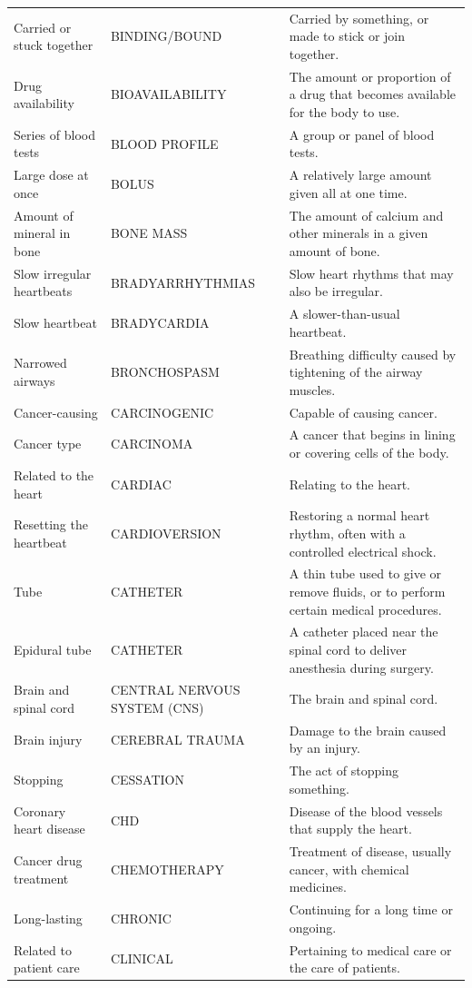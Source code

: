 \begin{longtable}{>{\raggedright\arraybackslash}p{} >{\raggedright\arraybackslash}p{} >{\raggedright\arraybackslash}p{}}
Carried or stuck together & BINDING/BOUND & Carried by something, or made to stick or join together. \\
Drug availability & BIOAVAILABILITY & The amount or proportion of a drug that becomes available for the body to use. \\
Series of blood tests & BLOOD PROFILE & A group or panel of blood tests. \\
Large dose at once & BOLUS & A relatively large amount given all at one time. \\
Amount of mineral in bone & BONE MASS & The amount of calcium and other minerals in a given amount of bone. \\
Slow irregular heartbeats & BRADYARRHYTHMIAS & Slow heart rhythms that may also be irregular. \\
Slow heartbeat & BRADYCARDIA & A slower-than-usual heartbeat. \\
Narrowed airways & BRONCHOSPASM & Breathing difficulty caused by tightening of the airway muscles. \\
Cancer-causing & CARCINOGENIC & Capable of causing cancer. \\
Cancer type & CARCINOMA & A cancer that begins in lining or covering cells of the body. \\
Related to the heart & CARDIAC & Relating to the heart. \\
Resetting the heartbeat & CARDIOVERSION & Restoring a normal heart rhythm, often with a controlled electrical shock. \\
Tube & CATHETER & A thin tube used to give or remove fluids, or to perform certain medical procedures. \\
Epidural tube & CATHETER & A catheter placed near the spinal cord to deliver anesthesia during surgery. \\
Brain and spinal cord & CENTRAL NERVOUS SYSTEM (CNS) & The brain and spinal cord. \\
Brain injury & CEREBRAL TRAUMA & Damage to the brain caused by an injury. \\
Stopping & CESSATION & The act of stopping something. \\
Coronary heart disease & CHD & Disease of the blood vessels that supply the heart. \\
Cancer drug treatment & CHEMOTHERAPY & Treatment of disease, usually cancer, with chemical medicines. \\
Long-lasting & CHRONIC & Continuing for a long time or ongoing. \\
Related to patient care & CLINICAL & Pertaining to medical care or the care of patients. \\

\end{longtable}
